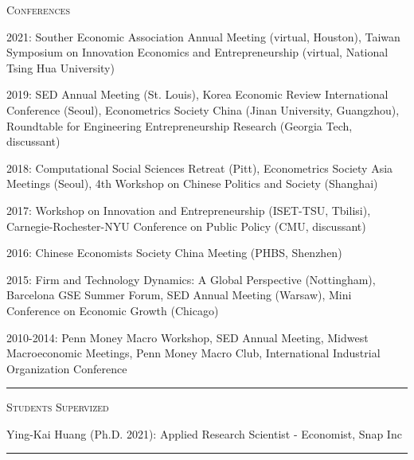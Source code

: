 \documentclass{article}
\begin{document}
\parbox{\textwidth}{
\parbox[t]{0.28\textwidth}{ \raggedright \noindent \textsc{ Conferences } }
\parbox[t]{0.72\textwidth}{ \raggedright

2021: Souther Economic Association Annual Meeting (virtual, Houston), Taiwan Symposium on Innovation Economics and Entrepreneurship (virtual, National Tsing Hua University)
\vspace{0.27cm}

2019: SED Annual Meeting (St. Louis), Korea Economic Review International Conference (Seoul), Econometrics Society China (Jinan University, Guangzhou), Roundtable for Engineering Entrepreneurship Research (Georgia Tech, discussant)
\vspace{0.27cm}

2018: Computational Social Sciences Retreat (Pitt), Econometrics Society Asia Meetings (Seoul), 4th Workshop on Chinese Politics and Society (Shanghai)
\vspace{0.27cm}

2017: Workshop on Innovation and Entrepreneurship (ISET-TSU, Tbilisi), Carnegie-Rochester-NYU Conference on Public Policy (CMU, discussant)
\vspace{0.27cm}

2016: Chinese Economists Society China Meeting (PHBS, Shenzhen)
\vspace{0.27cm}

2015: Firm and Technology Dynamics: A Global Perspective (Nottingham), Barcelona GSE Summer Forum, SED Annual Meeting (Warsaw), Mini Conference on Economic Growth (Chicago)
\vspace{0.27cm}

2010-2014: Penn Money Macro Workshop, SED Annual Meeting, Midwest Macroeconomic Meetings, Penn Money Macro Club, International Industrial Organization Conference
\vspace{0.27cm}

}
\textcolor{light-gray}{\hrule}
}
\vspace{0.3cm}

\parbox{\textwidth}{
\parbox[t]{0.28\textwidth}{ \raggedright \noindent \textsc{ Students Supervized } }
\parbox[t]{0.72\textwidth}{ \raggedright

Ying-Kai Huang (Ph.D. 2021): Applied Research Scientist - Economist, Snap Inc
\vspace{0.27cm}

}
\textcolor{light-gray}{\hrule}
}
\vspace{0.3cm}
\end{document}
